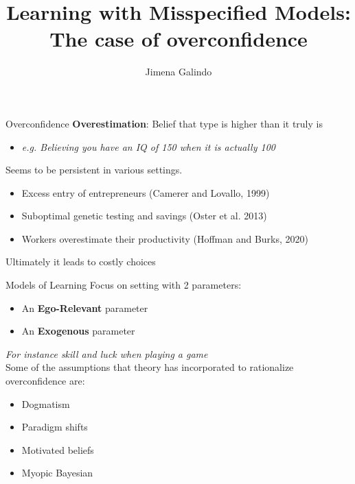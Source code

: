 \documentclass[aspectratio=169]{beamer}
\title{Learning with Misspecified Models:\\  
The case of overconfidence}
\author{Jimena Galindo}
\begin{document}
\frame{\titlepage}

\begin{frame}{Overconfidence}
    \textbf{Overestimation}: Belief that type is higher than it truly is\\
    \begin{itemize}
        \item \textit{e.g. Believing you have an IQ of 150 when it is actually 100}
    \end{itemize}
    \bigskip
    \pause
    Seems to be persistent in various settings. 
    \begin{itemize} 
        \item Excess entry of entrepreneurs (Camerer and Lovallo, 1999)
        \item Suboptimal genetic testing and savings (Oster et al. 2013)
        \item  Workers overestimate their productivity (Hoffman and Burks, 2020)
    \end{itemize}
    \bigskip
    \alert{Ultimately it leads to costly choices}
    
\end{frame}

\begin{frame}{Models of Learning}
    Focus on setting with 2 parameters:
    \begin{itemize}
        \item An \alert{\textbf{Ego-Relevant}} parameter
        \item An \alert{\textbf{Exogenous}} parameter
    \end{itemize}
    \textit{For instance skill and luck when playing a game}\\
    \bigskip
    \pause
    Some of the assumptions that theory has incorporated to rationalize overconfidence are:
    \begin{itemize}
        \item Dogmatism
        \item Paradigm shifts
        \item Motivated beliefs
        \item Myopic Bayesian
    \end{itemize}
\end{frame}
\end{document}
